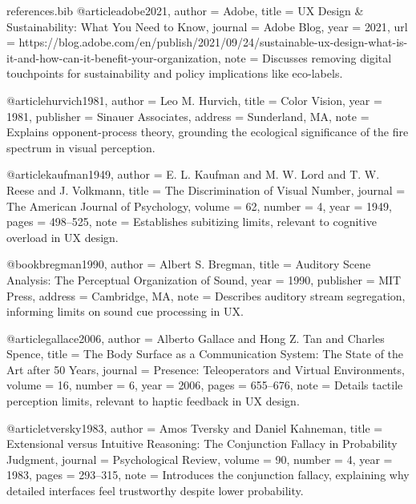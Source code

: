 \begin{filecontents*}{references.bib}
@article{adobe2021,
  author    = {{Adobe}},
  title     = {UX Design \& Sustainability: What You Need to Know},
  journal   = {Adobe Blog},
  year      = {2021},
  url       = {https://blog.adobe.com/en/publish/2021/09/24/sustainable-ux-design-what-is-it-and-how-can-it-benefit-your-organization},
  note      = {Discusses removing digital touchpoints for sustainability and policy implications like eco-labels.}
}

@article{hurvich1981,
  author    = {Leo M. Hurvich},
  title     = {Color Vision},
  year      = {1981},
  publisher = {Sinauer Associates},
  address   = {Sunderland, MA},
  note      = {Explains opponent-process theory, grounding the ecological significance of the fire spectrum in visual perception.}
}

@article{kaufman1949,
  author    = {E. L. Kaufman and M. W. Lord and T. W. Reese and J. Volkmann},
  title     = {The Discrimination of Visual Number},
  journal   = {The American Journal of Psychology},
  volume    = {62},
  number    = {4},
  year      = {1949},
  pages     = {498--525},
  note      = {Establishes subitizing limits, relevant to cognitive overload in UX design.}
}

@book{bregman1990,
  author    = {Albert S. Bregman},
  title     = {Auditory Scene Analysis: The Perceptual Organization of Sound},
  year      = {1990},
  publisher = {MIT Press},
  address   = {Cambridge, MA},
  note      = {Describes auditory stream segregation, informing limits on sound cue processing in UX.}
}

@article{gallace2006,
  author    = {Alberto Gallace and Hong Z. Tan and Charles Spence},
  title     = {The Body Surface as a Communication System: The State of the Art after 50 Years},
  journal   = {Presence: Teleoperators and Virtual Environments},
  volume    = {16},
  number    = {6},
  year      = {2006},
  pages     = {655--676},
  note      = {Details tactile perception limits, relevant to haptic feedback in UX design.}
}

@article{tversky1983,
  author    = {Amos Tversky and Daniel Kahneman},
  title     = {Extensional versus Intuitive Reasoning: The Conjunction Fallacy in Probability Judgment},
  journal   = {Psychological Review},
  volume    = {90},
  number    = {4},
  year      = {1983},
  pages     = {293--315},
  note      = {Introduces the conjunction fallacy, explaining why detailed interfaces feel trustworthy despite lower probability.}
}
\end{filecontents*}

